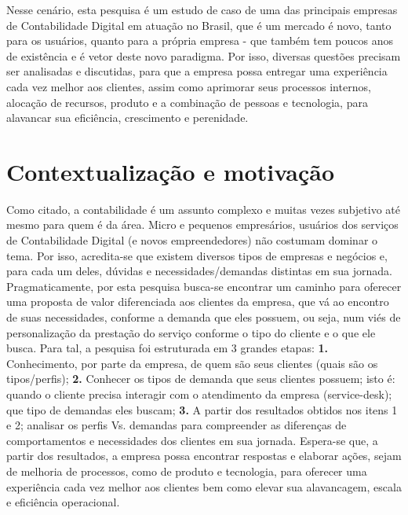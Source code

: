 \documentclass[twocolumn]{rbef}
\newcommand{\1}{\mathbbm{1}}
\begin{document}
\newline\linebreak Nesse cenário, esta pesquisa é um estudo de caso de uma das principais empresas de Contabilidade Digital em atuação no Brasil, que é um mercado é novo, tanto para os usuários, quanto para a própria empresa - que também tem poucos anos de existência e é vetor deste novo paradigma. Por isso, diversas questões precisam ser analisadas e discutidas, para que a empresa possa entregar uma experiência cada vez melhor aos clientes, assim como aprimorar seus processos internos, alocação de recursos, produto e a combinação de pessoas e tecnologia, para alavancar sua eficiência, crescimento e perenidade.



\section{Contextualização e motivação} \label{Sessao2}

Como citado, a contabilidade é um assunto complexo e muitas vezes subjetivo até mesmo para quem é da área. Micro e pequenos empresários, usuários dos serviços de Contabilidade Digital (e novos empreendedores) não costumam dominar o tema. Por isso, acredita-se que existem diversos tipos de empresas e negócios e, para cada um deles, dúvidas e necessidades/demandas distintas em sua jornada.
\newline\linebreak Pragmaticamente, por esta pesquisa busca-se encontrar um caminho para oferecer uma proposta de valor diferenciada aos clientes da empresa, que vá ao encontro de suas necessidades, conforme a demanda que eles possuem, ou seja, num viés de personalização da prestação do serviço conforme o tipo do cliente e o que ele busca. 
Para tal, a pesquisa foi estruturada em 3 grandes etapas: 
\newline\linebreak\textbf{1.} Conhecimento, por parte da empresa, de quem são seus clientes (quais são os tipos/perfis);  
\newline\linebreak\textbf{2.} Conhecer os tipos de demanda que seus clientes possuem; isto é: quando o cliente precisa interagir com o atendimento da empresa (service-desk); que tipo de demandas eles buscam; 
\newline\linebreak\textbf{3.} A partir dos resultados obtidos nos itens 1 e 2; analisar os perfis Vs. demandas para compreender as diferenças de comportamentos e necessidades dos clientes em sua jornada. 
Espera-se que, a partir dos resultados, a empresa possa encontrar respostas e elaborar ações, sejam de melhoria de processos, como de produto e tecnologia, para oferecer uma experiência cada vez melhor aos clientes bem como elevar sua alavancagem, escala e eficiência operacional.
\end{document}
